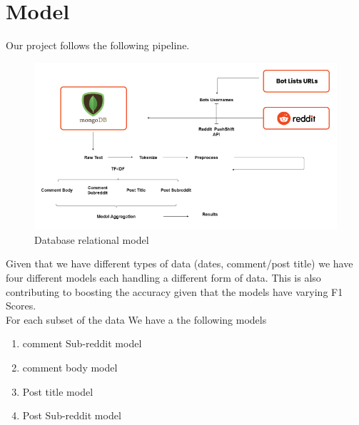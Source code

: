 \documentclass{article}
\begin{document}
\section{Model}
Our project follows the following pipeline. \par
\begin{figure}[H]
    \centering
    \includegraphics[width=15cm ,keepaspectratio]{pipeline}
    \caption{Database relational model}
\end{figure} 
Given that we have different types of data (dates, comment/post title) we have four different models each handling a different form of data. This is also contributing to boosting the accuracy given that the models have varying F1 Scores.\\
For each subset of the data We have a the following models
\begin{enumerate}
    \item comment Sub-reddit model
    \item comment body model
    \item Post title model
    \item Post Sub-reddit model
\end{enumerate}
    
\end{document}
